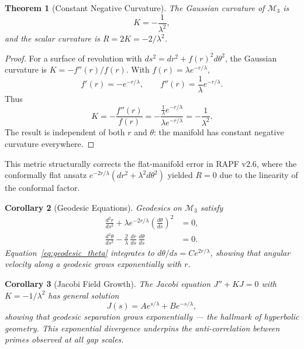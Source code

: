 \documentclass[12pt]{article}
\newtheorem{theorem}{Theorem}[section]
\newtheorem{corollary}[theorem]{Corollary}
\begin{document}
\begin{theorem}[Constant Negative Curvature]
The Gaussian curvature of $\mathcal{M}_3$ is
\begin{equation}
  K = -\frac{1}{\lambda^2},
  \label{eq:curvature}
\end{equation}
and the scalar curvature is $R = 2K = -2/\lambda^2$.
\end{theorem}
\label{thm:curvature}

\begin{proof}
For a surface of revolution with $ds^2 = dr^2 + f(r)^2 d\theta^2$, the Gaussian
curvature is $K = -f''(r)/f(r)$. With $f(r) = \lambda e^{-r/\lambda}$,
\[
  f'(r) = -e^{-r/\lambda}, \qquad
  f''(r) = \frac{1}{\lambda} e^{-r/\lambda}.
\]
Thus
\[
  K = -\frac{f''(r)}{f(r)} = -\frac{\frac{1}{\lambda} e^{-r/\lambda}}{\lambda e^{-r/\lambda}}
    = -\frac{1}{\lambda^2}.
\]
The result is independent of both $r$ and $\theta$: the manifold has constant
negative curvature everywhere.
\end{proof}

This metric structurally corrects the flat-manifold error in RAPF v2.6, where the
conformally flat ansatz $e^{-2r/\lambda}(dr^2 + \lambda^2 d\theta^2)$ yielded
$R = 0$ due to the linearity of the conformal factor.

\begin{corollary}[Geodesic Equations]
Geodesics on $\mathcal{M}_3$ satisfy
\begin{align}
  \frac{d^2 r}{ds^2} + \lambda e^{-2r/\lambda}\left(\frac{d\theta}{ds}\right)^2 &= 0,
  \label{eq:geodesic_r} \\
  \frac{d^2 \theta}{ds^2} - \frac{2}{\lambda}\,\frac{dr}{ds}\,\frac{d\theta}{ds} &= 0.
  \label{eq:geodesic_theta}
\end{align}
Equation~\eqref{eq:geodesic_theta} integrates to $d\theta/ds = C e^{2r/\lambda}$,
showing that angular velocity along a geodesic grows exponentially with $r$.
\end{corollary}

\begin{corollary}[Jacobi Field Growth]
The Jacobi equation $J'' + K J = 0$ with $K = -1/\lambda^2$ has general solution
\begin{equation}
  J(s) = A e^{s/\lambda} + B e^{-s/\lambda},
  \label{eq:jacobi}
\end{equation}
showing that geodesic separation grows exponentially --- the hallmark of
hyperbolic geometry. This exponential divergence underpins the anti-correlation
between primes observed at all gap scales.
\end{corollary}
\end{document}
